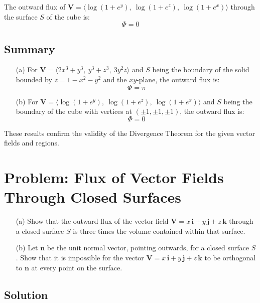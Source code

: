 \documentclass[11pt]{article}
\begin{document}
The outward flux of \( \mathbf{V} = \langle \log(1 + e^y), \ \log(1 + e^z), \ \log(1 + e^x) \rangle \) through the surface \( S \) of the cube is:
\[
\boxed{ \Phi = 0 }
\]

\newpage

\subsection{Summary}

\begin{enumerate}
    \item[(a)] For \( \mathbf{V} = \langle 2x^3 + y^3, \ y^3 + z^3, \ 3y^2 z \rangle \) and \( S \) being the boundary of the solid bounded by \( z = 1 - x^2 - y^2 \) and the \( xy \)-plane, the outward flux is:
    \[
    \Phi = \pi
    \]

    \item[(b)] For \( \mathbf{V} = \langle \log(1 + e^y), \ \log(1 + e^z), \ \log(1 + e^x) \rangle \) and \( S \) being the boundary of the cube with vertices at \( (\pm 1, \pm 1, \pm 1) \), the outward flux is:
    \[
    \Phi = 0
    \]
\end{enumerate}

These results confirm the validity of the Divergence Theorem for the given vector fields and regions.




\newpage

\section{Problem: Flux of Vector Fields Through Closed Surfaces}

\begin{enumerate}
    \item[(a)] Show that the outward flux of the vector field \( \mathbf{V} = x\,\mathbf{i} + y\,\mathbf{j} + z\,\mathbf{k} \) through a closed surface \( S \) is three times the volume contained within that surface.

    \item[(b)] Let \( \mathbf{n} \) be the unit normal vector, pointing outwards, for a closed surface \( S \). Show that it is impossible for the vector \( \mathbf{V} = x\,\mathbf{i} + y\,\mathbf{j} + z\,\mathbf{k} \) to be orthogonal to \( \mathbf{n} \) at every point on the surface.
\end{enumerate}

\newpage

\subsection{Solution}
\end{document}

